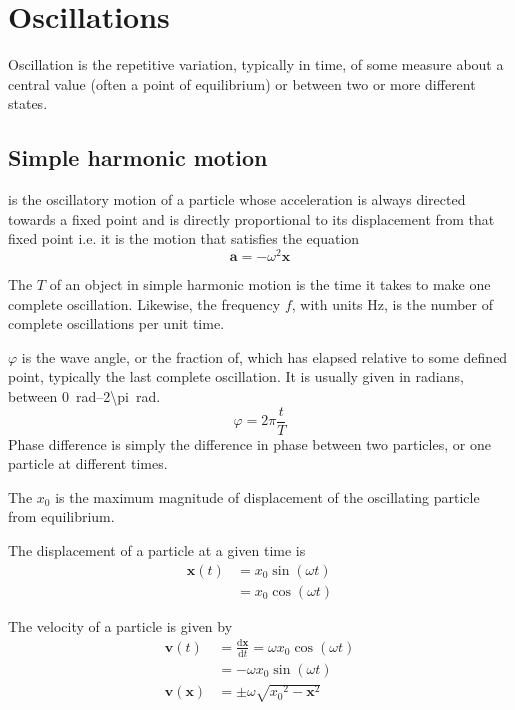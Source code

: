 \documentclass[Physics.tex]{subfiles}
\begin{document}
\chapter{Oscillations}
Oscillation is the repetitive variation, typically in time, of some measure about a central value (often a point of equilibrium) or between two or more different states.
\section{Simple harmonic motion}
 is the oscillatory motion of a particle whose acceleration is always directed towards a fixed point and is directly proportional to its displacement from that fixed point i.e. it is the motion that satisfies the equation \begin{equation}\mathbf{a} = -\omega^2\mathbf{x}\end{equation}

The  \(T\) of an object in simple harmonic motion is the time it takes to make one complete oscillation. Likewise, the frequency \(f\), with units \si{\hertz}, is the number of complete oscillations per unit time.

 \(\varphi\) is the wave angle, or the fraction of, which has elapsed relative to some defined point, typically the last complete oscillation. It is usually given in radians, between \SIrange{0}{2\pi}{\radian}. \begin{equation}\varphi = 2\pi\frac{t}{T}\end{equation} Phase difference is simply the difference in phase between two particles, or one particle at different times.

The  \(x_0\) is the maximum magnitude of displacement of the oscillating particle from equilibrium.

The displacement of a particle at a given time is \begin{equation}\begin{split}\mathbf{x}(t) &= x_0\sin(\omega t)\\&= x_0\cos(\omega t)\end{split}\end{equation}

The velocity of a particle is given by \begin{equation}\begin{split}\mathbf{v}(t) &= \frac{\mathrm{d}\mathbf{x}}{\mathrm{d}t} = \omega x_0\cos(\omega t)\\&= -\omega x_0\sin(\omega t)\\\mathbf{v}(\mathbf{x}) &= \pm \omega\sqrt{{x_0}^2 - \mathbf{x}^2}\end{split}\end{equation}
\end{document}
